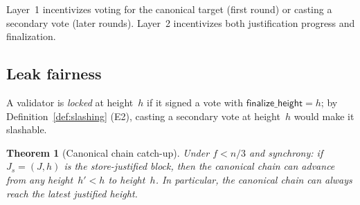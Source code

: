 \ifx\litemode\undefined\documentclass{article}\fi
\theoremstyle{plain}
\newtheorem{theorem}{Theorem}
\theoremstyle{definition}
\theoremstyle{remark}
\begin{document}
Layer~1 incentivizes voting for the canonical target (first round) or casting a secondary vote (later rounds).
Layer~2 incentivizes both justification progress and finalization.

\subsection{Leak fairness}

A validator is \emph{locked} at height~$h$ if it signed a vote with $\mathsf{finalize\_height} = h$; by Definition~\ref{def:slashing} (E2), casting a secondary vote at height~$h$ would make it slashable.

\begin{theorem}[Canonical chain catch-up]\label{thm:catchup}
Under $f < n/3$ and synchrony: if $J_s = (J, h)$ is the store-justified block, then the canonical chain can advance from any height~$h' < h$ to height~$h$.
In particular, the canonical chain can always reach the latest justified height.
\end{theorem}
\end{document}
